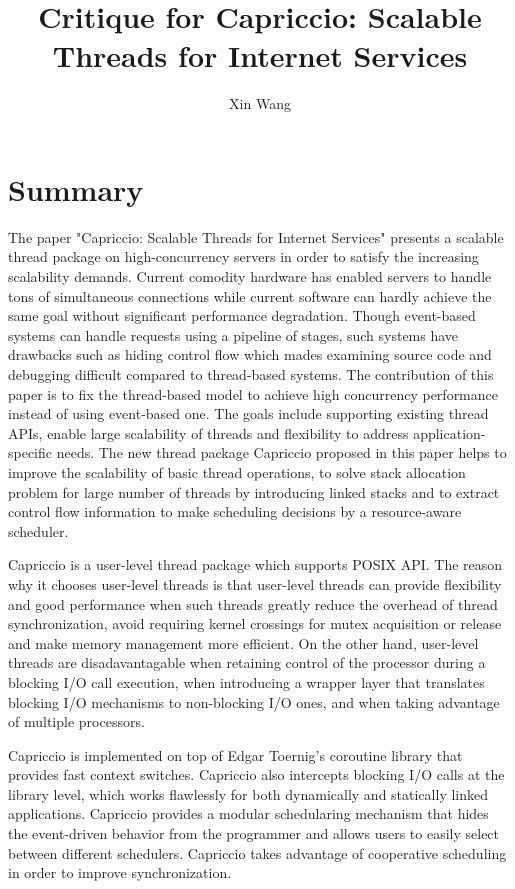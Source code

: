\documentclass[10pt, letterpaper]{article}
\title{Critique for Capriccio: Scalable Threads for Internet Services}
\author{Xin Wang}
\date{} %
\begin{document}
\maketitle

\section{Summary}
The paper "Capriccio: Scalable Threads for Internet Services"\cite{von2003capriccio} presents a
scalable thread package on high-concurrency servers in order to satisfy the increasing scalability demands.
Current comodity hardware has enabled servers to handle tons of simultaneous connections while current software
can hardly
achieve the same goal without significant performance degradation. Though event-based systems can handle
requests using a pipeline of stages, such systems have drawbacks such as hiding control flow which mades
examining source code and debugging difficult compared to thread-based systems. The contribution of this paper
is to fix the thread-based model to achieve high concurrency performance instead of using event-based one.
The goals include supporting existing thread APIs, enable large scalability of threads and flexibility to
address application-specific needs. The new thread package Capriccio proposed in this paper helps to improve the
scalability of basic thread operations, to solve stack allocation problem for large number of threads by
introducing linked stacks and to extract control flow information to make scheduling decisions by a
resource-aware scheduler.

Capriccio is a user-level thread package which supports POSIX API. The reason why it chooses user-level threads
is that user-level threads can provide flexibility and good performance when such threads greatly reduce the
overhead of thread synchronization, avoid requiring kernel crossings for mutex acquisition or release and make
memory management more efficient. On the other hand, user-level threads are disadavantagable when retaining
control of the processor during a blocking I/O call execution, when introducing a wrapper layer that translates
blocking I/O mechanisms to non-blocking I/O ones, and when taking advantage of multiple processors.

Capriccio is implemented on top of Edgar Toernig's coroutine library that provides fast context switches.
Capriccio also intercepts blocking I/O calls at the library level, which works flawlessly for both dynamically
and statically linked applications. Capriccio provides a modular schedularing mechanism that hides the
event-driven behavior from the programmer and allows users to easily select between different schedulers.
Capriccio takes advantage of cooperative scheduling in order to improve synchronization. 
\end{document}
